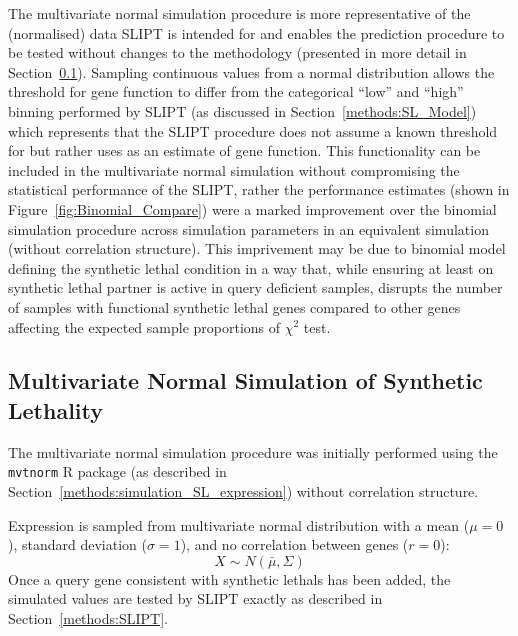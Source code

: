 The multivariate normal simulation procedure is more representative of the (normalised)  data \gls{SLIPT} is intended for and enables the prediction procedure to be tested without changes to the methodology (presented in more detail in Section~\ref{chapt2:simulation_mvtnorm}). Sampling continuous  values from a normal distribution allows the  threshold for gene function to differ from the categorical ``low'' and ``high''  binning performed by \gls{SLIPT} (as discussed in Section~\ref{methods:SL_Model}) which represents that the \gls{SLIPT} procedure does not assume a known threshold for  but rather uses  as an estimate of gene function. This functionality can be included in the multivariate normal simulation without compromising the statistical performance of the \gls{SLIPT}, rather the performance estimates (shown in Figure~\ref{fig:Binomial_Compare}) were a marked improvement over the binomial simulation procedure across simulation parameters in an equivalent simulation (without correlation structure). This imprivement may be due to binomial model defining the \gls{synthetic lethal} condition in a way that, while ensuring at least on \gls{synthetic lethal} partner is active in query deficient samples, disrupts the number of samples with functional \gls{synthetic lethal} genes compared to other genes affecting the expected sample proportions of $\chi^2$ test.

\FloatBarrier

\subsection{Multivariate Normal Simulation of Synthetic Lethality} \label{chapt2:simulation_mvtnorm}

The multivariate normal simulation procedure was initially performed using the \texttt{mvtnorm} R package \citep{Genz2009, mvtnorm} (as described in Section~\ref{methods:simulation_SL_expression}) without correlation structure.

Expression is sampled from multivariate normal distribution with a mean ($\mu = 0$), standard deviation ($\sigma = 1$), and no correlation between genes ($r = 0$): $$X\sim N(\bar{\mu},\Sigma)$$  Once a query gene consistent with \glspl{synthetic lethal} has been added, the simulated  values are tested by \gls{SLIPT} exactly as described in Section~\ref{methods:SLIPT}.

